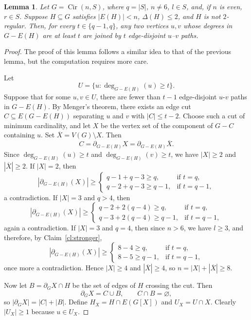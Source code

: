 \documentclass{article}
\newtheorem{lemma}[theorem]{Lemma}
\begin{document}
\begin{lemma}\label{ML-1002}
Let \(G=\operatorname{Cir}(n,S)\), where \(q=|S|\), \(n\neq 6\), \(l\in S\), and, if \(n\) is even, \(r\in S\). Suppose \(H\subseteq G\) satisfies \(|E(H)|<n\), \(\Delta(H)\le 2\), and \(H\) is not \(2\)-regular. Then, for every \(t\in\{q-1,q\}\), any two vertices \(u,v\) whose degrees in \(G-E(H)\) are at least \(t\) are joined by \(t\) edge-disjoint \(u\)--\(v\) paths.
\end{lemma}
\begin{proof}
The proof of this lemma follows a similar idea to that of the previous lemma, but the computation requires more care. 

Let  
\[
U=\{u:\deg_{G-E(H)}(u)\ge t\}.
\]
Suppose that for some \(u,v\in U\), there are fewer than \(t-1\) edge-disjoint \(u\)-\(v\) paths in \(G-E(H)\). By Menger's theorem, there exists an edge cut \(C\subseteq E(G-E(H))\) separating \(u\) and \(v\) with \(|C|\le t-2\). Choose such a cut of minimum cardinality, and let \(X\) be the vertex set of the component of \(G-C\) containing \(u\). Set $\overline{X}=V(G)\setminus X$. Then
\[
C=\partial_{G-E(H)}X=\partial_{G-E(H)}\overline{X}.
\]
Since \(\deg_{G-E(H)}(u)\ge t\) and \(\deg_{G-E(H)}(v)\ge t\), we have \(|X|\ge 2\) and \(|\overline{X}|\ge 2\). If \(|X|=2\), then
\[
|\partial_{G-E(H)}(X)|\ge
\begin{cases}
q-1+q-3\ge q, & \text{if } t=q,\\[4pt]
q-2+q-3\ge q-1, & \text{if } t=q-1,
\end{cases}
\]
a contradiction. If \(|X|=3\) and \(q>4\), then
\[
|\partial_{G-E(H)}(X)|\ge
\begin{cases}
q-2+2(q-4)\ge q, & \text{if } t=q,\\[4pt]
q-3+2(q-4)\ge q-1, & \text{if } t=q-1,
\end{cases}
\]
again a contradiction. If \(|X|=3\) and \(q=4\), then since \(n>6\), we have \(l\ge 3\), and therefore, by Claim~\ref{cl:stronger},
\[
|\partial_{G-E(H)}(X)|\ge
\begin{cases}
8-4\ge q, & \text{if } t=q,\\[4pt]
8-5\ge q-1, & \text{if } t=q-1,
\end{cases}
\]
once more a contradiction. Hence \(|X|\ge 4\) and \(|\overline{X}|\ge 4\), so \(n=|X|+|\overline{X}|\ge 8\). 

Now let \(B=\partial_G X\cap H\) be the set of edges of \(H\) crossing the cut. Then
\[
\partial_G X=C\cup B,\qquad C\cap B=\varnothing,
\]
so \(|\partial_G X|=|C|+|B|\). Define \(H_X=H\cap E(G[X])\) and \(U_X=U\cap X\). Clearly \(|U_X|\ge 1\) because \(u\in U_X\).


\end{proof}
\end{document}

